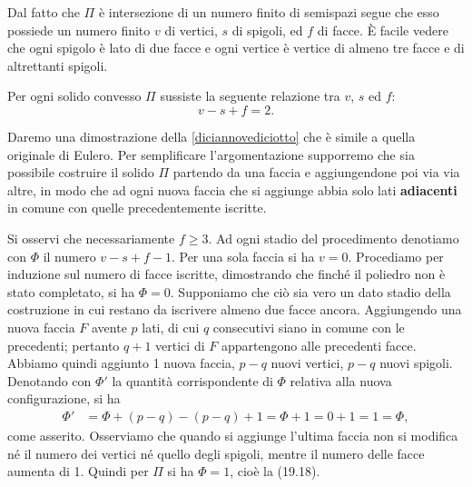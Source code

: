 \documentclass{article}
\theoremstyle{plain}
\theoremstyle{definition}
\theoremstyle{remark}
\begin{document}
\vspace{10pt}

Dal fatto che $\Pi$ è intersezione di un numero finito di semispazi segue che esso possiede un numero 
finito $v$ di vertici, $s$ di spigoli, ed $f$ di facce. 
È facile vedere che ogni spigolo è lato di due facce e ogni vertice è vertice di almeno tre facce e di altrettanti spigoli.

\vspace{10pt}

Per ogni solido convesso $\Pi$ sussiste la seguente relazione tra $v$, $s$ ed $f$:
\begin{equation}\label{diciannovediciotto}
v - s + f = 2. 
\end{equation}

\vspace{10pt}

Daremo una dimostrazione della \ref{diciannovediciotto} che è simile a quella originale di Eulero. Per semplificare l'argomentazione supporremo 
che sia possibile costruire il solido $\Pi$ partendo da una faccia e aggiungendone poi via via altre, in 
modo che ad ogni nuova faccia che si aggiunge abbia solo lati \textbf{adiacenti} in comune con quelle precedentemente 
iscritte.

\vspace{10pt}

Si osservi che necessariamente $f \geq 3$. Ad ogni stadio del procedimento denotiamo con $\Phi$ il numero 
$v - s + f - 1$. Per una sola faccia si ha $v = 0$. Procediamo per induzione sul numero di facce iscritte, 
dimostrando che finché il poliedro non è stato completato, si ha $\Phi = 0$. Supponiamo che ciò sia vero un 
dato stadio della costruzione in cui restano da iscrivere almeno due facce ancora. Aggiungendo una nuova faccia 
$F$ avente $p$ lati, di cui $q$ consecutivi siano in comune con le precedenti; pertanto $q + 1$ vertici di 
$F$ appartengono alle precedenti facce. Abbiamo quindi aggiunto 1 nuova faccia, $p - q$ nuovi vertici, 
$p - q$ nuovi spigoli. Denotando con $\Phi'$ la quantità corrispondente di $\Phi$ relativa alla nuova configurazione, 
si ha
\begin{align}
\Phi' &= \Phi + (p - q) - (p - q) + 1 = \Phi + 1 = 0 + 1 = 1 = \Phi,
\end{align}
come asserito. Osserviamo che quando si aggiunge l'ultima faccia non si modifica né il numero dei vertici 
né quello degli spigoli, mentre il numero delle facce aumenta di 1. Quindi per $\Pi$ si ha $\Phi = 1$, 
cioè la (19.18).
\end{document}
